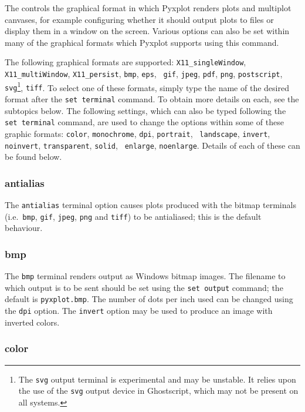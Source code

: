 The  controls the graphical format in which Pyxplot
renders plots and multiplot canvases, for example configuring whether it should
output plots to files or display them in a window on the screen. Various
options can also be set within many of the graphical formats which Pyxplot
supports using this command.

The following graphical formats are supported:  {\tt X11\_\-single\-Window},
{\tt X11\_\-multi\-Window}, {\tt X11\_\-persist}, {\tt bmp}, {\tt eps}, {\tt
gif}, {\tt jpeg}, {\tt pdf}, {\tt png}, {\tt postscript}, {\tt
svg}\footnote{The {\tt svg} output terminal is experimental and may be
unstable. It relies upon the use of the {\tt svg} output device in Ghostscript,
which may not be present on all systems.}, {\tt tiff}.  To select one of these
formats, simply type the name of the desired format after the {\tt set
terminal} command. To obtain more details on each, see the subtopics below.
The following settings, which can also be typed following the {\tt set
terminal} command, are used to change the options within some of these graphic
formats: {\tt color}, {\tt monochrome}, {\tt dpi}, {\tt portrait}, {\tt
landscape}, {\tt invert}, {\tt noinvert}, {\tt transparent}, {\tt solid}, {\tt
enlarge}, {\tt noenlarge}. Details of each of these can be found below.


\subsubsection{antialias}

The {\tt antialias} terminal option causes plots produced with the bitmap
terminals (i.e.\ {\tt bmp}, {\tt gif}, {\tt jpeg}, {\tt png} and {\tt tiff}) to be
antialiased; this is the default behaviour.


\subsubsection{bmp}

The {\tt bmp} terminal renders output as Windows bitmap images. The filename to
which output is to be sent should be set using the {\tt set output} command;
the default is {\tt pyxplot.bmp}. The number of dots per inch used can be
changed using the {\tt dpi} option. The {\tt invert} option may be used to produce an
image with inverted colors.


\subsubsection{color}

